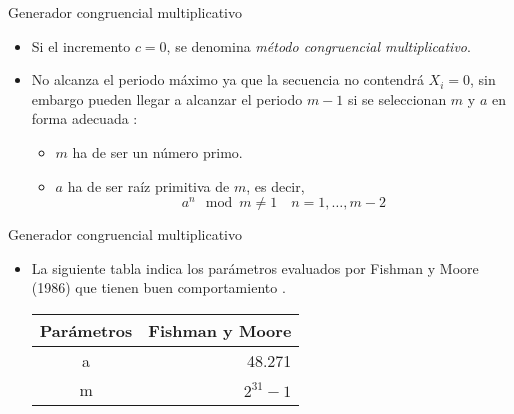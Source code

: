\begin{frame}{Generador congruencial multiplicativo}
    \begin{itemize}
        \item Si el incremento $c=0$, se denomina \textit{método congruencial multiplicativo}.
        \item No alcanza el periodo máximo ya que la secuencia no contendrá $X_i=0$, sin embargo pueden llegar a alcanzar el periodo $m-1$ si se seleccionan $m$ y $a$ en forma adecuada \cite{PSD}:
        \begin{itemize}
            \item $m$ ha de ser un número primo.
            \item $a$ ha de ser raíz primitiva de $m$, es decir, \begin{equation*}a^n \mod m \neq 1 \quad n=1,\dots, m-2\end{equation*}
        \end{itemize}
    \end{itemize}
\end{frame}

\begin{frame}{Generador congruencial multiplicativo}
    \begin{itemize}
    \item La siguiente tabla indica los parámetros evaluados por Fishman y Moore (1986) que tienen buen comportamiento \cite{PSD}.
    \begin{table}[]
    \begin{tabular}{|c|r|}
    \hline
    \rowcolor[HTML]{794033} 
    {\color[HTML]{FFFFFF} \textbf{Parámetros}} & {\color[HTML]{FFFFFF} \textbf{Fishman y Moore}} \\ \hline
    \rowcolor[HTML]{F28165} 
    a & 48.271\\ \hline
    \rowcolor[HTML]{F28165} 
    m & $2^{31}-1$ \\ \hline
    \end{tabular}
    \end{table}
    \end{itemize}
\end{frame}

